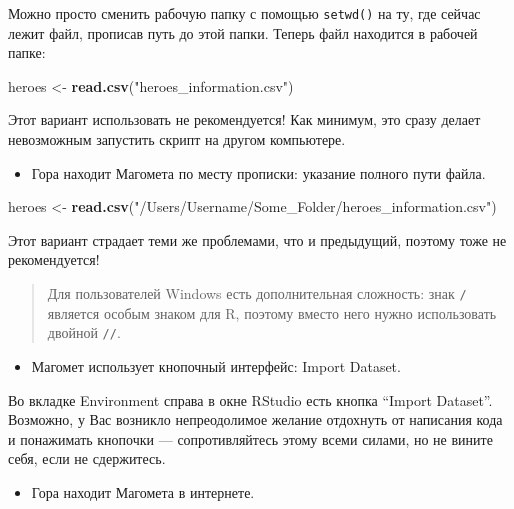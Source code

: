 \documentclass[
]{book}
\newenvironment{Shaded}{\begin{snugshade}}{\end{snugshade}}
\newcommand{\KeywordTok}[1]{\textcolor[rgb]{0.13,0.29,0.53}{\textbf{#1}}}
\newcommand{\NormalTok}[1]{#1}
\newcommand{\StringTok}[1]{\textcolor[rgb]{0.31,0.60,0.02}{#1}}
\providecommand{\tightlist}{%
  \setlength{\itemsep}{0pt}\setlength{\parskip}{0pt}}
\begin{document}
Можно просто сменить рабочую папку с помощью \texttt{setwd()} на ту, где сейчас лежит файл, прописав путь до этой папки. Теперь файл находится в рабочей папке:

\begin{Shaded}
\begin{Highlighting}[]
\NormalTok{heroes <-}\StringTok{ }\KeywordTok{read.csv}\NormalTok{(}\StringTok{"heroes_information.csv"}\NormalTok{)}
\end{Highlighting}
\end{Shaded}

Этот вариант использовать не рекомендуется! Как минимум, это сразу делает невозможным запустить скрипт на другом компьютере.

\begin{itemize}
\tightlist
\item
  Гора находит Магомета по месту прописки: указание полного пути файла.
\end{itemize}

\begin{Shaded}
\begin{Highlighting}[]
\NormalTok{heroes <-}\StringTok{ }\KeywordTok{read.csv}\NormalTok{(}\StringTok{"/Users/Username/Some_Folder/heroes_information.csv"}\NormalTok{)}
\end{Highlighting}
\end{Shaded}

Этот вариант страдает теми же проблемами, что и предыдущий, поэтому тоже не рекомендуется!

\begin{quote}
Для пользователей Windows есть дополнительная сложность: знак \texttt{/} является особым знаком для R, поэтому вместо него нужно использовать двойной \texttt{//}.
\end{quote}

\begin{itemize}
\tightlist
\item
  Магомет использует кнопочный интерфейс: Import Dataset.
\end{itemize}

Во вкладке Environment справа в окне RStudio есть кнопка ``Import Dataset''. Возможно, у Вас возникло непреодолимое желание отдохнуть от написания кода и понажимать кнопочки --- сопротивляйтесь этому всеми силами, но не вините себя, если не сдержитесь.

\begin{itemize}
\tightlist
\item
  Гора находит Магомета в интернете.
\end{itemize}
\end{document}
